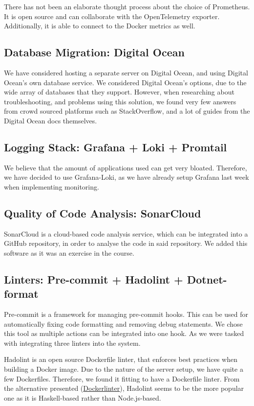 There has not been an elaborate thought process about the choice of Prometheus. It is open source and can collaborate with the OpenTelemetry exporter. Additionally, it is able to connect to the Docker metrics as well.

\subsection{Database Migration: Digital Ocean}

We have considered hosting a separate server on Digital Ocean, and using Digital Ocean's own database service. We considered Digital Ocean's options, due to the wide array of databases that they support. However, when researching about troubleshooting, and problems using this solution, we found very few answers from crowd sourced platforms such as StackOverflow, and a lot of guides from the Digital Ocean docs themselves.

\subsection{Logging Stack: Grafana + Loki + Promtail}

We believe that the amount of applications used can get very bloated. Therefore, we have decided to use Grafana-Loki, as we have already setup Grafana last week when implementing monitoring.

\subsection{Quality of Code Analysis: SonarCloud}

SonarCloud is a cloud-based code analysis service, which can be integrated into a GitHub repository, in order to analyse the code in said repository. We added this software as it was an exercise in the course.

\subsection{Linters: Pre-commit + Hadolint + Dotnet-format}
Pre-commit is a framework for managing pre-commit hooks. This can be used for automatically fixing code formatting and removing debug statements. We chose this tool as multiple actions can be integrated into one hook. As we were tasked with integrating three linters into the system.

Hadolint is an open source Dockerfile linter, that enforces best practices when building a Docker image. Due to the nature of the server setup, we have quite a few Dockerfiles. Therefore, we found it fitting to have a Dockerfile linter. From the alternative presented (\href{https://github.com/RedCoolBeans/dockerlint}{Dockerlinter}), Hadolint seems to be the more popular one as it is Haskell-based rather than Node.js-based.

